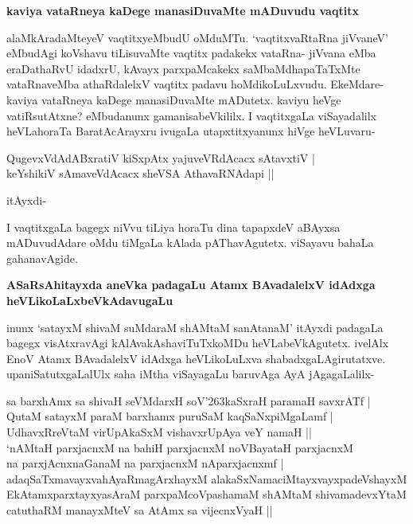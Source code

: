 {\bigskip
\noindent
{\large\bf kaviya vataRneya kaDege manasiDuvaMte mADuvudu vaqtitx}}\label{page245}
\medskip

\noindent
alaMkAradaMteyeV vaqtitxyeMbudU oMduMTu. `vaqtitxvaRtaRna jiVvaneV' eMbudAgi koVshavu tiLisuvaMte vaqtitx padakekx vataRna- jiVvana eMba eraDathaRvU idadxrU, kAvayx parxpaMcakekx saMbaMdha\-paTaTxMte vataRnaveMba athaRdalelxV vaqtitx padavu hoMdikoLuLxvudu. EkeMdare- kaviya vataRneya kaDege manasiDu\-vaMte mADutetx. kaviyu heVge vatiRsutAtxne? eMbudanunx gamanisabeVkililx. I vaqtitxgaLa viSaya\-dalilx heVLahoraTa BaratAcArayxru ivugaLa utapxtitxyanunx hiVge heVLuvaru-

\begin{shloka}
QugevxVdAdABxratiV kiSxpAtx yajuveVRdAcacx sAtavxtiV |\\\label{245}
keYshikiV sAmaveVdAcacx sheVSA AthavaRNAdapi || 
\end{shloka}
\noindent
itAyxdi-

I vaqtitxgaLa bagegx niVvu tiLiya horaTu dina tapapxdeV aBAyxsa mADuvudAdare oMdu tiMgaLa kAlada pAThavAgutetx. viSayavu bahaLa gahanavAgide.

{\bigskip
\noindent
{\large\bf ASaRsAhitayxda aneVka padagaLu Atamx BAvadalelxV idAdxga heVLikoLaLxbeVkAdavugaLu}}
\medskip

\noindent
inunx `satayxM shivaM suMdaraM shAMtaM sanAtanaM' itAyxdi padagaLa bagegx visAtxravAgi kAlAvakAshaviTuTx\-koMDu heVLabeVkAgutetx. ivelAlx EnoV Atamx BAvadalelxV idAdxga heVLikoLuLxva shabadxgaLAgiru\-tatxve. upa\-niSatutxgaLalUlx saha iMtha viSayagaLu baruvAga AyA jAgagaLalilx-

\begin{shloka}
sa barxhAmx sa shivaH seVMdarxH soV\char'263kaSxraH paramaH savxrATf |\\\label{246}
QutaM satayxM paraM barxhamx puruSaM kaqSaNxpiMgaLamf |\\\label{246}
UdhavxRreVtaM virUpAkaSxM vishavxrUpAya veY namaH ||\\
`nAMtaH parxjacnxM na bahiH parxjacnxM noVBayataH parxjacnxM \\\label{246}
na parxjAcnxnaGanaM na parxjacnxM nAparxjacnxmf |\\
adaqSaTxmavayxvahAyaRmagArxhayxM alakaSxNamaciMtayxvayxpadeVshayxM \\
EkAtamxparxtayxyasAraM parxpaMcoVpashamaM shAMtaM shivamadevxYtaM \\
catuthaRM manayxMteV sa AtAmx sa vijecnxVyaH ||
\end{shloka}

